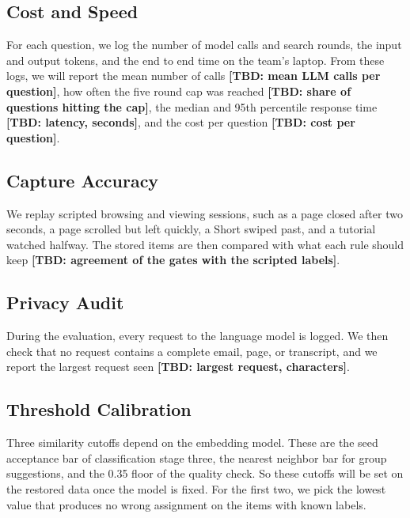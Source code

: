 \documentclass[conference]{IEEEtran}
\newcommand{\tbd}[1]{\textbf{[TBD: #1]}}
\begin{document}
\subsection{Cost and Speed}
For each question, we log the number of model calls and search rounds, the input and output tokens, and the end to end time on the team's laptop. From these logs, we will report the mean number of calls \tbd{mean LLM calls per question}, how often the five round cap was reached \tbd{share of questions hitting the cap}, the median and 95th percentile response time \tbd{latency, seconds}, and the cost per question \tbd{cost per question}.

\subsection{Capture Accuracy}
We replay scripted browsing and viewing sessions, such as a page closed after two seconds, a page scrolled but left quickly, a Short swiped past, and a tutorial watched halfway. The stored items are then compared with what each rule should keep \tbd{agreement of the gates with the scripted labels}.

\subsection{Privacy Audit}
During the evaluation, every request to the language model is logged. We then check that no request contains a complete email, page, or transcript, and we report the largest request seen \tbd{largest request, characters}.

\subsection{Threshold Calibration}
Three similarity cutoffs depend on the embedding model. These are the seed acceptance bar of classification stage three, the nearest neighbor bar for group suggestions, and the 0.35 floor of the quality check. So these cutoffs will be set on the restored data once the model is fixed. For the first two, we pick the lowest value that produces no wrong assignment on the items with known labels.

\end{document}
